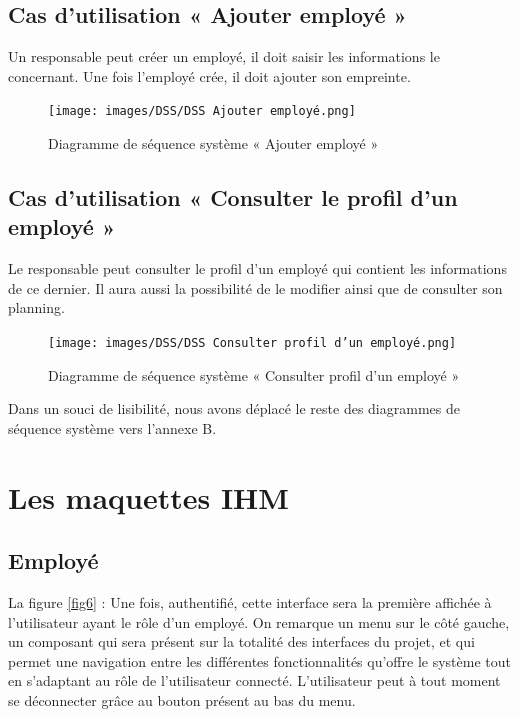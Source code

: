 \subsection{Cas d'utilisation « Ajouter employé »}
Un responsable peut créer un employé, il doit saisir les informations le
concernant. Une fois l’employé crée, il doit ajouter son empreinte.   

\clearpage
\begin{figure}[h!]
     \centering
    \texttt{[image: images/DSS/DSS Ajouter employé.png]}
     \caption{Diagramme de séquence système « Ajouter employé »}
     \label{fig4}
\end{figure}

\subsection{Cas d'utilisation « Consulter le profil d'un employé »}
Le responsable peut consulter le profil d’un employé qui contient les
informations de ce dernier. Il aura aussi la possibilité de le modifier ainsi
que de consulter son planning.

\clearpage
\begin{figure}[h!]
     \centering
    \texttt{[image: images/DSS/DSS Consulter profil d'un employé.png]}
     \caption{Diagramme de séquence système « Consulter profil d'un employé »}
     \label{fig4}
\end{figure}

Dans un souci de lisibilité, nous avons déplacé le reste des diagrammes de
séquence système vers l’annexe B.  
    
\section{Les maquettes IHM }
\vspace{-5pt}    
\subsection{Employé}
La figure \ref{fig6} : Une fois, authentifié, cette interface sera la première
affichée à l’utilisateur ayant le rôle d’un employé. On remarque un menu sur le
côté gauche, un composant qui sera présent sur la totalité des interfaces du
projet, et qui permet une navigation entre les différentes fonctionnalités
qu’offre le système tout en s’adaptant au rôle de l’utilisateur connecté.
L’utilisateur peut à tout moment se déconnecter grâce au bouton présent au bas
du menu.

